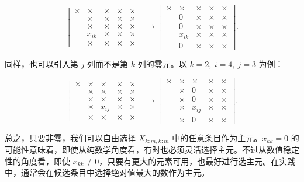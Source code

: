 \documentclass[UTF8,fontset=none,12pt]{ctexart}
\theoremstyle{definition}
\begin{document}
\begin{equation*}
\begin{bmatrix}
\times&\times&\times&\times&\times\\
&\times&\times&\times&\times\\
&\times&\times&\times&\times\\
&x_{ik}&\bm{\times}&\bm{\times}&\bm{\times}\\
&\times&\times&\times&\times
\end{bmatrix}
\longrightarrow
\begin{bmatrix}
\times&\times&\times&\times&\times\\
&0&\bm{\times}&\bm{\times}&\bm{\times}\\
&0&\bm{\times}&\bm{\times}&\bm{\times}\\
&x_{ik}&\bm{\times}&\bm{\times}&\bm{\times}\\
&0&\bm{\times}&\bm{\times}&\bm{\times}
\end{bmatrix}.
\end{equation*}

同样，也可以引入第 $j$ 列而不是第 $k$ 列的零元。以 $k=2,\ i=4,\ j=3$ 为例：

\begin{equation*}
\begin{bmatrix}
\times&\times&\times&\times&\times\\
&\times&\times&\times&\times\\
&\times&\times&\times&\times\\
&\bm{\times}&x_{ij}&\bm{\times}&\bm{\times}\\
&\times&\times&\times&\times
\end{bmatrix}
\longrightarrow
\begin{bmatrix}
\times&\times&\times&\times&\times\\
&\bm{\times}&0&\bm{\times}&\bm{\times}\\
&\bm{\times}&0&\bm{\times}&\bm{\times}\\
&\times&x_{ij}&\bm{\times}&\bm{\times}\\
&\bm{\times}&0&\bm{\times}&\bm{\times}
\end{bmatrix}.
\end{equation*}

总之，只要非零，我们可以自由选择 $X_{k:m,k:m}$ 中的任意条目作为主元。$x_{kk}=0$ 的可能性意味着，即使从纯数学角度看，有时也必须灵活选择主元。不过从数值稳定性的角度看，即使 $x_{kk}\ne0$，只要有更大的元素可用，也最好进行选主元。在实践中，通常会在候选条目中选择绝对值最大的数作为主元。
\end{document}
